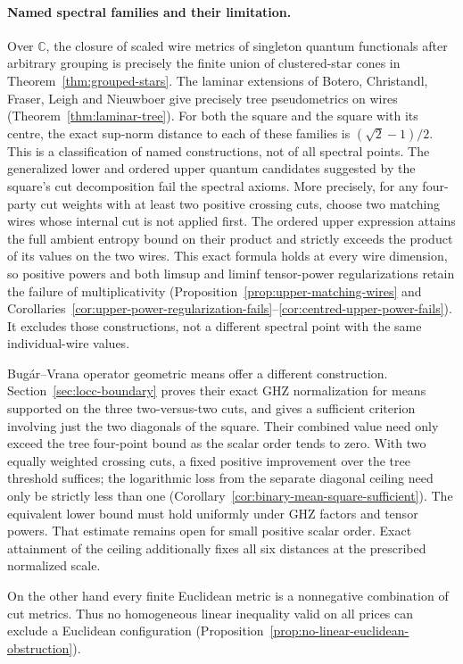 \documentclass[11pt,a4paper]{article}
\newcommand{\C}{\mathbb C}
\theoremstyle{definition}
\theoremstyle{remark}
\begin{document}
\paragraph{Named spectral families and their limitation.}
Over $\C$, the closure of scaled wire metrics of singleton
quantum functionals after arbitrary grouping is precisely the
finite union of clustered-star cones in
Theorem~\ref{thm:grouped-stars}.
The laminar extensions of Botero, Christandl, Fraser, Leigh and
Nieuwboer give precisely tree pseudometrics on wires
(Theorem~\ref{thm:laminar-tree}).
For both the square and the square with its centre, the exact
sup-norm distance to each of these families is
$(\sqrt2-1)/2$.
This is a classification of named constructions, not of all
spectral points. The generalized lower and ordered upper
quantum candidates suggested by the square's cut decomposition
fail the spectral axioms. More precisely, for any four-party cut
weights with at least two positive crossing cuts, choose two matching
wires whose internal cut is not applied first. The ordered upper
expression attains the full ambient entropy bound on their product
and strictly exceeds the product of its values on the two wires.
This exact formula holds at every wire dimension, so positive powers
and both limsup and liminf tensor-power regularizations retain the
failure of multiplicativity
(Proposition~\ref{prop:upper-matching-wires} and
Corollaries~\ref{cor:upper-power-regularization-fails}--\ref{cor:centred-upper-power-fails}).
It excludes those constructions, not a different spectral point
with the same individual-wire values.

Bug\'ar--Vrana operator geometric means offer a different construction.
Section~\ref{sec:locc-boundary} proves their exact GHZ normalization
for means supported on the three two-versus-two cuts, and gives a
sufficient criterion involving just the two diagonals of the square.
Their combined value need only exceed the tree four-point bound
as the scalar order tends to zero. With two equally weighted
crossing cuts, a fixed positive improvement over the tree
threshold suffices; the logarithmic loss from the separate
diagonal ceiling need only be strictly less than one
(Corollary~\ref{cor:binary-mean-square-sufficient}).
The equivalent lower bound must hold uniformly under GHZ factors
and tensor powers. That estimate remains open for small positive
scalar order. Exact attainment of the ceiling additionally fixes
all six distances at the prescribed normalized scale.

On the other hand every finite Euclidean metric is a
nonnegative combination of cut metrics.
Thus no homogeneous linear inequality valid on all prices
can exclude a Euclidean configuration
(Proposition~\ref{prop:no-linear-euclidean-obstruction}).
\end{document}
